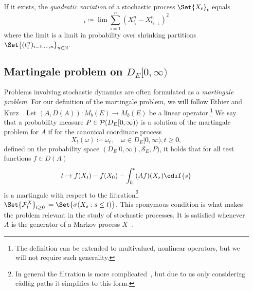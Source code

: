 \begin{definition}
  If it exists, the \textit{quadratic variation} of a stochastic process \(\Set{X_t}_{t}\) equals
  \begin{equation}
    [X]_t \coloneqq \lim \sum_{i=1}^n (X_{t_i}^n - X_{t_{i-1}}^n)^2
  \end{equation}
  where the limit is a limit in probability over shrinking partitions \(\Set{(t_i^n)_{i=1,\dots,n}}_{n\in\bN}\).
\end{definition}



\subsection{Martingale problem on \texorpdfstring{\(D_E[0,\infty)\)}{D([0,infinity), E)}}\label{sec:martingale-problem}

Problems involving stochastic dynamics are often formulated as a \textit{martingale problem}.
For our definition of the martingale problem, we will follow Ethier and Kurz~\cite[p.174]{ethierMarkovProcessesCharacterization1985}.
Let \((A, D(A)) : M_b(E) \to M_b(E)\) be a linear operator.\footnote{The definition can be extended to multivalued, nonlinear operators, but we will not require such generality.}
We say that a probability measure \(P \in \mathcal{P}(D_E[0,\infty))\) is a solution of the martingale problem for \( A \) if for the canonical coordinate process
\begin{equation}
  X_t(\omega) \coloneqq \omega_t, \quad \omega \in D_E[0,\infty), t \geq 0,
\end{equation}
defined on the probability space \((D_E[0,\infty), \mathscr{S}_E, P)\), it holds that for all test functions \(f \in D(A)\)
\begin{equation}\label{eq:mart-problem}
  t \mapsto f(X_t) - f(X_0) - \int_0^t (Af)(X_s) \odif{s}
\end{equation}
is a martingale with respect to the filtration\footnote{In general the filtration is more complicated~\cite[see eq. (4.3.2)]{ethierMarkovProcessesCharacterization1985}, but due to us only considering càdlàg paths it simplifies to this form.} \(\Set{\cF_t^X}_{t\geq0} \coloneqq \Set{\sigma(X_s : s \leq t)}\). %
This eponymous condition is what makes the problem relevant in the study of stochastic processes.
It is satisfied whenever \(A\) is the generator of a Markov process \(X\)~\cite[161-162]{ethierMarkovProcessesCharacterization1985}.

